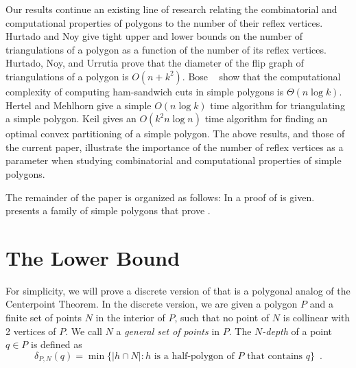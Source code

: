 \documentclass{birkjour}
\begin{document}
Our results continue an existing line of research relating the
combinatorial and computational properties of polygons to the number
of their reflex vertices.   Hurtado and Noy \cite{hn96} give tight
upper and lower bounds on the number of triangulations of a polygon as
a function of the number of its reflex vertices.  Hurtado, Noy, and
Urrutia \cite{hnu99} prove that the diameter of the flip graph of
triangulations of a polygon is $O(n+k^2)$.   Bose \etal\ \cite{geoham}
show that the computational complexity of computing ham-sandwich cuts
in simple polygons is $\Theta(n\log k)$.  Hertel and Mehlhorn
\cite{hm83} give a simple $O(n\log k)$ time algorithm for
triangulating a simple polygon.  Keil \cite{k85} gives an $O(k^2 n\log
n)$ time algorithm for finding an optimal convex partitioning of a
simple polygon.  The above results, and those of the current paper,
illustrate the importance of the number of reflex vertices as a
parameter when studying combinatorial and computational properties of
simple polygons.

The remainder of the paper is organized as follows: In
 a proof of  is given.
 presents a family of simple polygons that prove
.

\section{The Lower Bound}

For simplicity, we will prove a discrete version of
 that is a polygonal analog of the Centerpoint
Theorem.  In the discrete version, we are given a polygon $P$ and a
finite set of points $N$ in the interior of $P$, such that no point of
$N$ is collinear with 2 vertices of $P$.  We call $N$ a \emph{general
set of points} in $P$. The \emph{$N$-depth} of a point $q\in P$ is
defined as 
\[
     \delta_{P,N}(q) = \min\{|h\cap N| : \mbox{$h$ is a half-polygon
	of $P$ that contains $q$} \} \enspace .
\]
\end{document}
